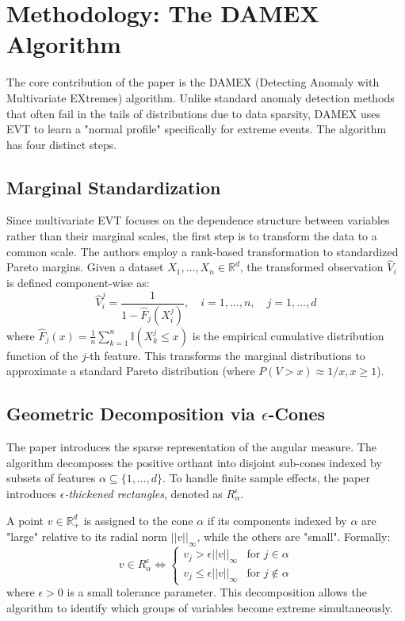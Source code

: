 \documentclass[11pt]{article}
\begin{document}
\section{Methodology: The DAMEX Algorithm}
The core contribution of the paper is the DAMEX (Detecting Anomaly with Multivariate EXtremes) algorithm. Unlike standard anomaly detection methods that often fail in the tails of distributions due to data sparsity, DAMEX uses EVT to learn a "normal profile" specifically for extreme events. The algorithm has four distinct steps.

\subsection{Marginal Standardization}
Since multivariate EVT focuses on the dependence structure between variables rather than their marginal scales, the first step is to transform the data to a common scale. The authors employ a rank-based transformation to standardized Pareto margins.
Given a dataset $X_1, \dots, X_n \in \mathbb{R}^d$, the transformed observation $\hat{V}_i$ is defined component-wise as:
\begin{equation}
    \hat{V}_i^j = \frac{1}{1 - \hat{F}_j(X_i^j)}, \quad i=1,\dots,n, \quad j=1,\dots,d
\end{equation}
where $\hat{F}_j(x) = \frac{1}{n} \sum_{k=1}^n \mathbb{I}(X_k^j \le x)$ is the empirical cumulative distribution function of the $j$-th feature. This transforms the marginal distributions to approximate a standard Pareto distribution (where $P(V > x) \approx 1/x, x \geq 1$).

\subsection{Geometric Decomposition via $\epsilon$-Cones}
The paper introduces the sparse representation of the angular measure. The algorithm decomposes the positive orthant into disjoint sub-cones indexed by subsets of features $\alpha \subseteq \{1, \dots, d\}$. To handle finite sample effects, the paper introduces \textit{$\epsilon$-thickened rectangles}, denoted as $R_\alpha^\epsilon$.

A point $v \in \mathbb{R}_+^d$ is assigned to the cone $\alpha$ if its components indexed by $\alpha$ are "large" relative to its radial norm $||v||_\infty$, while the others are "small". Formally:
\begin{equation}
    v \in R_\alpha^\epsilon \iff \begin{cases} 
        v_j > \epsilon ||v||_\infty & \text{for } j \in \alpha \\
        v_j \le \epsilon ||v||_\infty & \text{for } j \notin \alpha 
    \end{cases}
\end{equation}
where $\epsilon > 0$ is a small tolerance parameter. This decomposition allows the algorithm to identify which groups of variables become extreme simultaneously.
\end{document}
